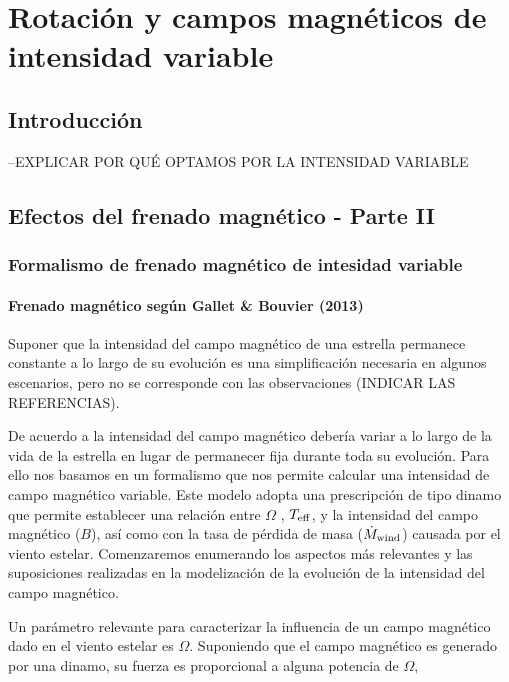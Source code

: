 \chapter{Rotación y campos magnéticos de intensidad variable}\label{ch:sexto-capitulo}

\section{Introducción}
--EXPLICAR POR QUÉ OPTAMOS POR LA INTENSIDAD VARIABLE

\section{Efectos del frenado magnético - Parte II}

\subsection{Formalismo de frenado magnético de intesidad variable} 

\subsubsection{Frenado magnético según Gallet \& Bouvier (2013)}
Suponer que la intensidad del campo magnético de una estrella permanece constante a lo largo de su evolución es una simplificación necesaria en algunos escenarios, pero no se corresponde con las observaciones (INDICAR LAS REFERENCIAS). \par

De acuerdo a \cite{Gallet2013} la intensidad del campo magnético debería variar a lo largo de la vida de la estrella en lugar de permanecer fija durante toda su evolución. Para ello nos basamos en un formalismo que nos permite calcular una intensidad de campo magnético variable. Este modelo adopta una prescripción de tipo dinamo que permite establecer una relación entre $\Omega$ , $T_{\mathrm{eff}}$, y la intensidad del campo magnético ($B$), así como con la tasa de pérdida de masa ($\Dot{M}_{\mathrm{wind}}$) causada por el viento estelar. Comenzaremos enumerando los aspectos más relevantes y las suposiciones realizadas en la modelización de la evolución de la intensidad del campo magnético.\par 

Un parámetro relevante para caracterizar la influencia de un campo magnético dado en el viento estelar es $\Omega$. Suponiendo que el campo magnético es generado por una dinamo, su fuerza es proporcional a alguna potencia de $\Omega$,

